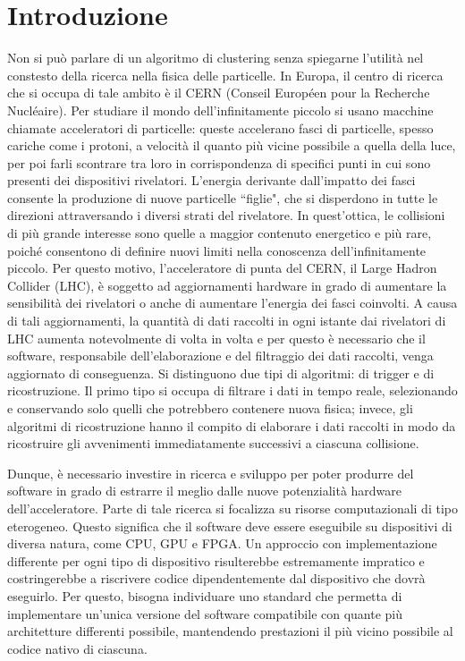 \documentclass[12pt,a4paper]{report}
\begin{document}
\chapter*{Introduzione}
Non si può parlare di un algoritmo di clustering senza spiegarne l'utilità nel constesto della ricerca nella fisica delle particelle. In Europa, il centro di ricerca che si occupa di tale ambito è il CERN (Conseil Européen pour la Recherche Nucléaire). Per studiare il mondo dell'infinitamente piccolo si usano macchine chiamate acceleratori di particelle: queste accelerano fasci di particelle, spesso cariche come i protoni, a velocità il quanto più vicine possibile a quella della luce, per poi farli scontrare tra loro in corrispondenza di specifici punti in cui sono presenti dei dispositivi rivelatori. L'energia derivante dall'impatto dei fasci consente la produzione di nuove particelle ``figlie", che si disperdono in tutte le direzioni attraversando i diversi strati del rivelatore. In quest'ottica, le collisioni di più grande interesse sono quelle a maggior contenuto energetico e più rare, poiché consentono di definire nuovi limiti nella conoscenza dell'infinitamente piccolo. Per questo motivo, l'acceleratore di punta del CERN, il Large Hadron Collider (LHC), è soggetto ad aggiornamenti hardware in grado di aumentare la sensibilità dei rivelatori o anche di aumentare l'energia dei fasci coinvolti. A causa di tali aggiornamenti, la quantità di dati raccolti in ogni istante dai rivelatori di LHC aumenta notevolmente di volta in volta e per questo è necessario che il software, responsabile dell'elaborazione e del filtraggio dei dati raccolti, venga aggiornato di conseguenza. Si distinguono due tipi di algoritmi: di trigger e di ricostruzione. Il primo tipo si occupa di filtrare i dati in tempo reale, selezionando e conservando solo quelli che potrebbero contenere nuova fisica; invece, gli algoritmi di ricostruzione hanno il compito di elaborare i dati raccolti in modo da ricostruire gli avvenimenti immediatamente successivi a ciascuna collisione.

Dunque, è necessario investire in ricerca e sviluppo per poter produrre del software in grado di estrarre il meglio dalle nuove potenzialità hardware dell'acceleratore. Parte di tale ricerca si focalizza su risorse computazionali di tipo eterogeneo. Questo significa che il software deve essere eseguibile su dispositivi di diversa natura, come CPU, GPU e FPGA. Un approccio con implementazione differente per ogni tipo di dispositivo risulterebbe estremamente impratico e costringerebbe a riscrivere codice dipendentemente dal dispositivo che dovrà eseguirlo. Per questo, bisogna individuare uno standard che permetta di implementare un'unica versione del software compatibile con quante più architetture differenti possibile, mantendendo prestazioni il più vicino possibile al codice nativo di ciascuna. 
\end{document}
